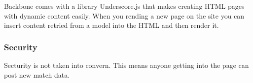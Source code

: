 Backbone comes with a library Underscore.js that makes creating HTML pages with dynamic content easily. When you rending a new page on the site you can insert content retried from a model into the HTML and then render it.



\subsubsection{Security}
Secturity is not taken into convern. This means anyone getting into the page can post new match data. 